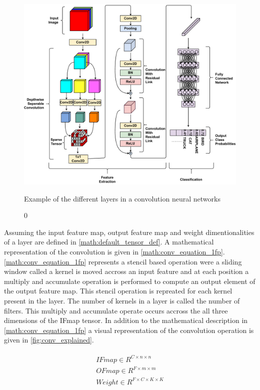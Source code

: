 \begin{figure}[ht]
    \centering
    \includegraphics[scale=0.4]{fig/cnn.pdf}
    \caption0{Example of the different layers in a convolution neural networks}
    \label{fig:cnn_network}
\end{figure}


Assuming the input feature map, output feature map and weight dimentionalities
of a layer are defined in \autoref{math:default_tensor_def}. A mathematical
representation of the convolution is given in \autoref{math:conv_equation_1fp}.
\autoref{math:conv_equation_1fp} represents a stencil based operation were a
sliding window called a kernel is moved accross an input feature and at each
position a multiply and accumulate operation is performed to compute an output
element of the output feature map. This stencil operation is repreated for each
kernel present in the layer. The number of kernels in a layer is called the
number of filters. This multiply and accumulate operate occurs accross the all
three dimensions of the IFmap tensor. In addition to the mathematical
description in \autoref{math:conv_equation_1fp} a visual representation of the
convolution operation is given in \autoref{fig:conv_explained}. 


\begin{align}
    \begin{split}
        IFmap \in R^{C \times n\times n} \\
        OFmap \in  R^{F \times m\times m} \\
        Weight \in R^{F \times C\times K\times K} \\
    \end{split}
    \label{math:default_tensor_def}
\end{align}

